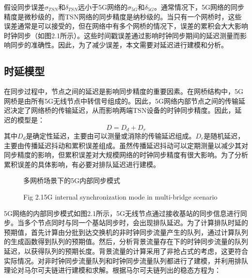 \documentclass[UTF8,a4paper,12pt]{ctexart}
\numberwithin{equation}{section}
\begin{document}
	假设同步误差$\sigma_{TSN}$和$\delta_{TSN}$远小于5G网络的$\sigma_{5G}$和$\delta_{5G}$。通常情况下，5G网络的同步精度是微秒级的，而TSN网络的同步精度是纳秒级的。当只有一个网桥时，这些误差通常是可以接受的，但在网络中有多个网桥的情况下，误差的累积会大大影响时钟同步（如图2.1所示）。这些时间戳误差通过影响时钟同步期间的延迟测量而影响同步的准确性。因此，为了减少误差，本文需要对延迟进行建模和分析。
	\subsection{时延模型}
	在同步过程中，节点之间的延迟是影响同步精度的重要因素。在网桥结构中，5G网桥是由所有5G无线节点中转信号组成的。因此，5G网络内部节点之间的传输延迟决定了网络桥的传输延迟，从而影响两端TSN设备的时钟同步精度。因此，延迟的模型是：
	\begin{equation}
		D=D_d+D_r
	\end{equation}
	其中$D_d$是确定性延迟，主要由可以测量或消除的传输延迟组成。$D_r$是随机延迟，主要由传播延迟抖动和累积误差组成。虽然传播延迟抖动可以定期测量以减少其对同步精度的影响，但累积误差对大规模网络的时钟同步精度有很大影响。为了分析累积误差的具体影响，有必要对排队延迟进行建模。
	\begin{figure}[htb] 
		\caption{多网桥场景下的5G内部同步模式}
		\vspace{-10pt}
		\caption*{Fig 2.1\quad 5G internal synchronization mode in multi-bridge scenario}
	\end{figure}
	5G网络的内部同步模式如图2.1所示，5G无线节点通过接收基站的同步信息进行同步。当多个节点同时与同一个基站同步时，会出现排队延迟。为了计算排队时延的预期值，首先计算由分批到达交换机的非时钟同步流量产生的队列，通过计算队列的生成函数得到队列的预期值。然后，分析背景流量存在下的时钟同步流量的队列延迟，以获得队列的预期长度。背景流量的计算采用了非抢占式的考虑，这更符合实际情况。对非时钟同步流量队列和时钟同步流量队列都进行了建模，并利用排队理论对马尔可夫链进行建模和求解。根据马尔可夫链列出的稳态方程为：
	
\end{document}
